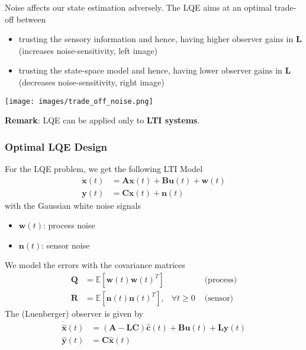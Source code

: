 Noise affects our state estimation adversely. The LQE aims at an optimal trade-off between
\begin{itemize}
    \item trusting the sensory information and hence, having higher observer gains in $\mathbf{L}$ (increases noise-sensitivity, left image)
    \item trusting the state-space model and hence, having lower observer gains in $\mathbf{L}$ (decreases noise-sensitivity, right image)
\end{itemize}
\begin{center}
    \texttt{[image: images/trade\_off\_noise.png]}
\end{center}

\textbf{Remark}: LQE can be applied only to \textbf{LTI systems}.\

\subsubsection{Optimal LQE Design}
For the LQE problem, we get the following LTI Model
\begin{align*}
    \dot{\mathbf{x}}(t) & = \mathbf{Ax}(t)+\mathbf{Bu}(t)+\mathbf{w}(t) \\
    \mathbf{y}(t)       & = \mathbf{Cx}(t)+\mathbf{n}(t)
\end{align*}
with the Gaussian white noise signals
\begin{itemize}
    \item $\mathbf{w}(t)$: process noise
    \item $\mathbf{n}(t)$: sensor noise
\end{itemize}
We model the errors with the covariance matrices
\begin{align*}
    \mathbf{Q} & =\mathbb{E}[\mathbf{w}(t){\mathbf{w}(t)}^T]  &                & \text{ (process)} \\
    \mathbf{R} & =\mathbb{E}[\mathbf{n}(t){\mathbf{n}(t)}^T], & \forall t\geq0 & \text{ (sensor)}
\end{align*}
The (Luenberger) observer is given by
\begin{align*}
    \dot{\hat{\mathbf{x}}}(t) & =(\mathbf{A}-\mathbf{LC})\hat{\mathbf{c}}(t)+\mathbf{Bu}(t)+\mathbf{Ly}(t) \\
    \hat{\mathbf{y}}(t)       & =\mathbf{C}\hat{\mathbf{x}}(t)
\end{align*}


